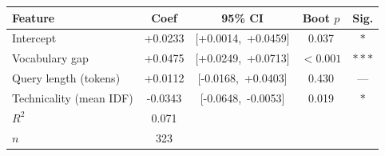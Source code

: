 \begin{tabular}{lSSSc}
\toprule
\textbf{Feature} & \textbf{Coef} & \textbf{95\% CI} & \textbf{Boot $p$} & \textbf{Sig.} \\
\midrule
Intercept & +0.0233 & {[+0.0014,\, +0.0459]} & 0.037 & $*$ \\
Vocabulary gap & +0.0475 & {[+0.0249,\, +0.0713]} & {$<\!0.001$} & $***$ \\
Query length (tokens) & +0.0112 & {[-0.0168,\, +0.0403]} & 0.430 & {---} \\
Technicality (mean IDF) & -0.0343 & {[-0.0648,\, -0.0053]} & 0.019 & $*$ \\
\midrule
$R^2$ & 0.071 & & & \\
$n$ & 323 & & & \\
\bottomrule
\end{tabular}
